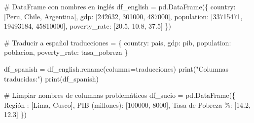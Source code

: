 \documentclass[
  doc,
  floatsintext,
  longtable,
  a4paper,
  nolmodern,
  notxfonts,
  notimes,
  12pt,
  colorlinks=true,linkcolor=blue,citecolor=blue,urlcolor=blue]{apa7}
\newenvironment{Shaded}{\begin{snugshade}}{\end{snugshade}}
\newcommand{\BuiltInTok}[1]{\textcolor[rgb]{0.00,0.23,0.31}{#1}}
\newcommand{\CommentTok}[1]{\textcolor[rgb]{0.37,0.37,0.37}{#1}}
\newcommand{\DecValTok}[1]{\textcolor[rgb]{0.68,0.00,0.00}{#1}}
\newcommand{\FloatTok}[1]{\textcolor[rgb]{0.68,0.00,0.00}{#1}}
\newcommand{\NormalTok}[1]{\textcolor[rgb]{0.00,0.23,0.31}{#1}}
\newcommand{\OperatorTok}[1]{\textcolor[rgb]{0.37,0.37,0.37}{#1}}
\newcommand{\StringTok}[1]{\textcolor[rgb]{0.13,0.47,0.30}{#1}}
\begin{document}
\begin{Shaded}
\begin{Highlighting}[]
\CommentTok{\# DataFrame con nombres en inglés}
\NormalTok{df\_english }\OperatorTok{=}\NormalTok{ pd.DataFrame(\{}
    \StringTok{\textquotesingle{}country\textquotesingle{}}\NormalTok{: [}\StringTok{\textquotesingle{}Peru\textquotesingle{}}\NormalTok{, }\StringTok{\textquotesingle{}Chile\textquotesingle{}}\NormalTok{, }\StringTok{\textquotesingle{}Argentina\textquotesingle{}}\NormalTok{],}
    \StringTok{\textquotesingle{}gdp\textquotesingle{}}\NormalTok{: [}\DecValTok{242632}\NormalTok{, }\DecValTok{301000}\NormalTok{, }\DecValTok{487000}\NormalTok{],}
    \StringTok{\textquotesingle{}population\textquotesingle{}}\NormalTok{: [}\DecValTok{33715471}\NormalTok{, }\DecValTok{19493184}\NormalTok{, }\DecValTok{45810000}\NormalTok{],}
    \StringTok{\textquotesingle{}poverty\_rate\textquotesingle{}}\NormalTok{: [}\FloatTok{20.5}\NormalTok{, }\FloatTok{10.8}\NormalTok{, }\FloatTok{37.5}\NormalTok{]}
\NormalTok{\})}

\CommentTok{\# Traducir a español}
\NormalTok{traducciones }\OperatorTok{=}\NormalTok{ \{}
    \StringTok{\textquotesingle{}country\textquotesingle{}}\NormalTok{: }\StringTok{\textquotesingle{}pais\textquotesingle{}}\NormalTok{,}
    \StringTok{\textquotesingle{}gdp\textquotesingle{}}\NormalTok{: }\StringTok{\textquotesingle{}pib\textquotesingle{}}\NormalTok{,}
    \StringTok{\textquotesingle{}population\textquotesingle{}}\NormalTok{: }\StringTok{\textquotesingle{}poblacion\textquotesingle{}}\NormalTok{,}
    \StringTok{\textquotesingle{}poverty\_rate\textquotesingle{}}\NormalTok{: }\StringTok{\textquotesingle{}tasa\_pobreza\textquotesingle{}}
\NormalTok{\}}

\NormalTok{df\_spanish }\OperatorTok{=}\NormalTok{ df\_english.rename(columns}\OperatorTok{=}\NormalTok{traducciones)}
\BuiltInTok{print}\NormalTok{(}\StringTok{"Columnas traducidas:"}\NormalTok{)}
\BuiltInTok{print}\NormalTok{(df\_spanish)}

\CommentTok{\# Limpiar nombres de columnas problemáticos}
\NormalTok{df\_sucio }\OperatorTok{=}\NormalTok{ pd.DataFrame(\{}
    \StringTok{\textquotesingle{}Región \textquotesingle{}}\NormalTok{: [}\StringTok{\textquotesingle{}Lima\textquotesingle{}}\NormalTok{, }\StringTok{\textquotesingle{}Cusco\textquotesingle{}}\NormalTok{],}
    \StringTok{\textquotesingle{}PIB (millones)\textquotesingle{}}\NormalTok{: [}\DecValTok{100000}\NormalTok{, }\DecValTok{8000}\NormalTok{],}
    \StringTok{\textquotesingle{}Tasa de Pobreza \%\textquotesingle{}}\NormalTok{: [}\FloatTok{14.2}\NormalTok{, }\FloatTok{12.3}\NormalTok{]}
\NormalTok{\})}


\end{Highlighting}
\end{Shaded}
\end{document}
